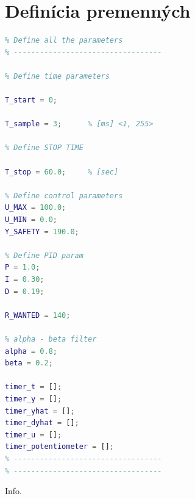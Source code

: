 \documentclass[a4paper, 10pt, ]{article}
\begin{document}
\section{Definícia premenných}
\begin{lstlisting}[caption=Definícia všetkých potrebných premenných., label={code:vars}, language=Matlab]
% ----------------------------------
% Define all the parameters
% ----------------------------------

% Define time parameters

T_start = 0;

T_sample = 3;      % [ms] <1, 255>

% Define STOP TIME

T_stop = 60.0;     % [sec]

% Define control parameters
U_MAX = 100.0;
U_MIN = 0.0;
Y_SAFETY = 190.0;

% Define PID param
P = 1.0;
I = 0.30;
D = 0.19;

R_WANTED = 140;

% alpha - beta filter
alpha = 0.8;
beta = 0.2;

timer_t = [];
timer_y = [];
timer_yhat = [];
timer_dyhat = [];
timer_u = [];
timer_potentiometer = [];
% ----------------------------------
% ----------------------------------
\end{lstlisting}

Info.
\end{document}
